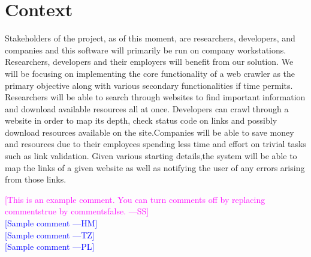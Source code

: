 \documentclass[12pt]{article}
\newcommand{\authornote}[3]{\textcolor{#1}{[#3 ---#2]}}
\newcommand{\authornote}[3]{}
\newcommand{\wss}[1]{\authornote{magenta}{SS}{#1}}
\newcommand{\hm}[1]{\authornote{blue}{HM}{#1}} %
\newcommand{\tz}[1]{\authornote{blue}{TZ}{#1}} %
\newcommand{\pl}[1]{\authornote{blue}{PL}{#1}} %
\begin{document}
\section{Context}

Stakeholders of the project, as of this moment, are researchers, developers, and companies and this software will primarily be run on company workstations.\\

Researchers, developers and their employers will benefit from our solution. We will be focusing on implementing the core functionality of a web crawler as the primary objective along with various secondary functionalities if time permits. Researchers will be able to search through websites to find important information and download available resources all at once. Developers can crawl through a website in order to map its depth, check status code on links and possibly download resources available on the site.Companies will be able to save money and resources due to their employees spending less time and effort on trivial tasks such as link validation. Given various starting details,the system will be able to map the links of a given website as well as notifying the user of any errors arising from those links.\newline



\noindent \wss{This is an example comment.  You can turn comments off by replacing
  commentstrue by commentsfalse.}\\
\hm{Sample comment}\\
\tz{Sample comment}\\
\pl{Sample comment}
\end{document}
